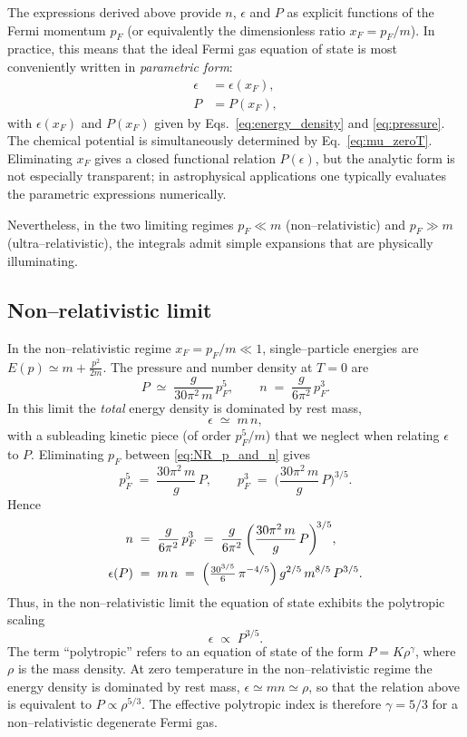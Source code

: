 The expressions derived above provide $n$, $\epsilon$ and $P$ as explicit functions of the
Fermi momentum $p_F$ (or equivalently the dimensionless ratio $x_F=p_F/m$). In practice,
this means that the ideal Fermi gas equation of state is most conveniently written in
\emph{parametric form}:
\begin{align}
\epsilon &= \epsilon(x_F), \\
P &= P(x_F),
\end{align}
with $\epsilon(x_F)$ and $P(x_F)$ given by
Eqs.~\eqref{eq:energy_density} and \eqref{eq:pressure}. The chemical potential
is simultaneously determined by Eq.~\eqref{eq:mu_zeroT}. Eliminating $x_F$ gives a
closed functional relation $P(\epsilon)$, but the analytic form is not especially
transparent; in astrophysical applications one typically evaluates the parametric
expressions numerically.

Nevertheless, in the two limiting regimes $p_F \ll m$ (non--relativistic) and
$p_F \gg m$ (ultra--relativistic), the integrals admit simple expansions that are
physically illuminating.

\subsection*{Non--relativistic limit}
In the non--relativistic regime $x_F=p_F/m\ll 1$, single--particle energies are
$E(p)\simeq m+\frac{p^2}{2m}$. The pressure and number density at $T=0$ are
\begin{equation}
P \;\simeq\; \frac{g}{30\pi^2\,m}\,p_F^5,
\qquad
n \;=\; \frac{g}{6\pi^2}\,p_F^3.
\label{eq:NR_p_and_n}
\end{equation}
In this limit the \emph{total} energy density is dominated by rest mass,
\begin{equation}
\epsilon \;\simeq\; m\,n,
\label{eq:NR_eps_total}
\end{equation}
with a subleading kinetic piece (of order $p_F^5/m$) that we neglect when relating
$\epsilon$ to $P$. Eliminating $p_F$ between \eqref{eq:NR_p_and_n} gives
\[
p_F^5 \;=\; \frac{30\pi^2\,m}{g}\,P,
\qquad
p_F^3 \;=\; \biggl(\frac{30\pi^2\,m}{g}\,P\biggr)^{\!3/5}.
\]
Hence
\begin{align}
n \;&=\; \frac{g}{6\pi^2}\,p_F^3
\;=\; \frac{g}{6\pi^2}\,\biggl(\frac{30\pi^2\,m}{g}\,P\biggr)^{\!3/5},
\\[2pt]
\epsilon(P) \;&=\; m\,n
\;=\; \Bigl(\tfrac{30^{3/5}}{6}\,\pi^{-4/5}\Bigr)\,
g^{2/5}\,m^{8/5}\,P^{3/5}.
\end{align}
Thus, in the non--relativistic limit the equation of state exhibits the polytropic scaling
\begin{equation}
\epsilon \;\propto\; P^{3/5}.
\end{equation}
The term ``polytropic'' refers to an equation of state of the form 
$P = K \rho^\gamma$, where $\rho$ is the mass density. 
At zero temperature in the non--relativistic regime the energy density is dominated 
by rest mass, $\epsilon \simeq m n \simeq \rho$, so that the relation above is 
equivalent to $P \propto \rho^{5/3}$. The effective polytropic index is therefore 
$\gamma = 5/3$ for a non--relativistic degenerate Fermi gas.

